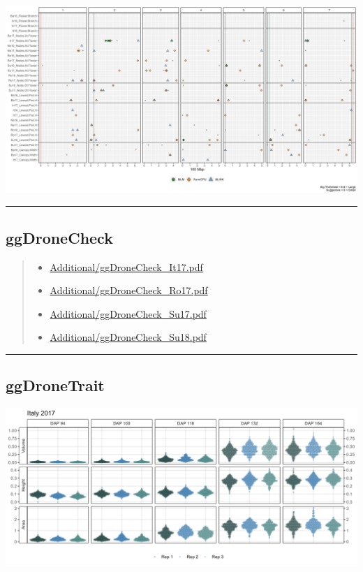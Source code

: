 \documentclass[
]{article}
\providecommand{\tightlist}{%
  \setlength{\itemsep}{0pt}\setlength{\parskip}{0pt}}
\begin{document}
\includegraphics{Additional/Additional_Figure_13_9.png}

\begin{center}\rule{0.5\linewidth}{0.5pt}\end{center}

\subsection{ggDroneCheck}\label{ggdronecheck}

\begin{quote}
\begin{itemize}
\tightlist
\item
  \href{https://github.com/derekmichaelwright/AGILE_LDP_UAV/Additional/ggDroneCheck_It17.pdf}{Additional/ggDroneCheck\_It17.pdf}
\item
  \href{https://github.com/derekmichaelwright/AGILE_LDP_UAV/Additional/ggDroneCheck_Ro17.pdf}{Additional/ggDroneCheck\_Ro17.pdf}
\item
  \href{https://github.com/derekmichaelwright/AGILE_LDP_UAV/Additional/ggDroneCheck_Su17.pdf}{Additional/ggDroneCheck\_Su17.pdf}
\item
  \href{https://github.com/derekmichaelwright/AGILE_LDP_UAV/Additional/ggDroneCheck_Su18.pdf}{Additional/ggDroneCheck\_Su18.pdf}
\end{itemize}
\end{quote}

\begin{center}\rule{0.5\linewidth}{0.5pt}\end{center}

\subsection{ggDroneTrait}\label{ggdronetrait}

\includegraphics{Additional/ggDroneTrait_It17.png}
\end{document}
